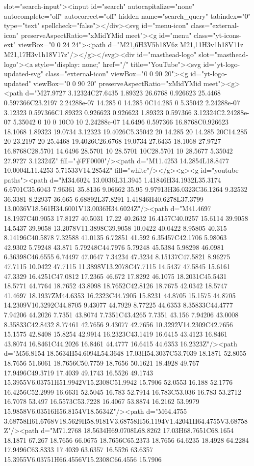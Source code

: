 {{{{{slot="search-input"><input id="search" autocapitalize="none" autocomplete="off" autocorrect="off" hidden name="search_query" tabindex="0" type="text" spellcheck="false"></div><svg id="menu-icon" class="external-icon" preserveAspectRatio="xMidYMid meet"><g id="menu" class="yt-icons-ext" viewBox="0 0 24 24"><path d="M21,6H3V5h18V6z M21,11H3v1h18V11z M21,17H3v1h18V17z"/></g></svg><div id="masthead-logo" slot="masthead-logo"><a style="display: none;" href="/" title="YouTube"><svg id="yt-logo-updated-svg" class="external-icon" viewBox="0 0 90 20"><g id="yt-logo-updated" viewBox="0 0 90 20" preserveAspectRatio="xMidYMid meet"><g><path d="M27.9727 3.12324C27.6435 1.89323 26.6768 0.926623 25.4468 0.597366C23.2197 2.24288e-07 14.285 0 14.285 0C14.285 0 5.35042 2.24288e-07 3.12323 0.597366C1.89323 0.926623 0.926623 1.89323 0.597366 3.12324C2.24288e-07 5.35042 0 10 0 10C0 10 2.24288e-07 14.6496 0.597366 16.8768C0.926623 18.1068 1.89323 19.0734 3.12323 19.4026C5.35042 20 14.285 20 14.285 20C14.285 20 23.2197 20 25.4468 19.4026C26.6768 19.0734 27.6435 18.1068 27.9727 16.8768C28.5701 14.6496 28.5701 10 28.5701 10C28.5701 10 28.5677 5.35042 27.9727 3.12324Z" fill="#FF0000"/><path d="M11.4253 14.2854L18.8477 10.0004L11.4253 5.71533V14.2854Z" fill="white"/></g><g><g id="youtube-paths"><path d="M34.6024 13.0036L31.3945 1.41846H34.1932L35.3174 6.6701C35.6043 7.96361 35.8136 9.06662 35.95 9.97913H36.0323C36.1264 9.32532 36.3381 8.22937 36.665 6.68892L37.8291 1.41846H40.6278L37.3799 13.0036V18.561H34.6001V13.0036H34.6024Z"/><path d="M41.4697 18.1937C40.9053 17.8127 40.5031 17.22 40.2632 16.4157C40.0257 15.6114 39.9058 14.5437 39.9058 13.2078V11.3898C39.9058 10.0422 40.0422 8.95805 40.315 8.14196C40.5878 7.32588 41.0135 6.72851 41.592 6.35457C42.1706 5.98063 42.9302 5.79248 43.871 5.79248C44.7976 5.79248 45.5384 5.98298 46.0981 6.36398C46.6555 6.74497 47.0647 7.34234 47.3234 8.15137C47.5821 8.96275 47.7115 10.0422 47.7115 11.3898V13.2078C47.7115 14.5437 47.5845 15.6161 47.3329 16.4251C47.0812 17.2365 46.672 17.8292 46.1075 18.2031C45.5431 18.5771 44.7764 18.7652 43.8098 18.7652C42.8126 18.7675 42.0342 18.5747 41.4697 18.1937ZM44.6353 16.2323C44.7905 15.8231 44.8705 15.1575 44.8705 14.2309V10.3292C44.8705 9.43077 44.7929 8.77225 44.6353 8.35833C44.4777 7.94206 44.2026 7.7351 43.8074 7.7351C43.4265 7.7351 43.156 7.94206 43.0008 8.35833C42.8432 8.77461 42.7656 9.43077 42.7656 10.3292V14.2309C42.7656 15.1575 42.8408 15.8254 42.9914 16.2323C43.1419 16.6415 43.4123 16.8461 43.8074 16.8461C44.2026 16.8461 44.4777 16.6415 44.6353 16.2323Z"/><path d="M56.8154 18.5634H54.6094L54.3648 17.03H54.3037C53.7039 18.1871 52.8055 18.7656 51.6061 18.7656C50.7759 18.7656 50.1621 18.4928 49.767 17.9496C49.3719 17.4039 49.1743 16.5526 49.1743 15.3955V6.03751H51.9942V15.2308C51.9942 15.7906 52.0553 16.188 52.1776 16.4256C52.2999 16.6631 52.5045 16.783 52.7914 16.783C53.036 16.783 53.2712 16.7078 53.497 16.5573C53.7228 16.4067 53.8874 16.2162 53.9979 15.9858V6.03516H56.8154V18.5634Z"/><path d="M64.4755 3.68758H61.6768V18.5629H58.9181V3.68758H56.1194V1.42041H64.4755V3.68758Z"/><path d="M71.2768 18.5634H69.0708L68.8262 17.03H68.7651C68.1654 18.1871 67.267 18.7656 66.0675 18.7656C65.2373 18.7656 64.6235 18.4928 64.2284 17.9496C63.8333 17.4039 63.6357 16.5526 63.6357 15.3955V6.03751H66.4556V15.2308C66.4556 15.7906 }}}}}
